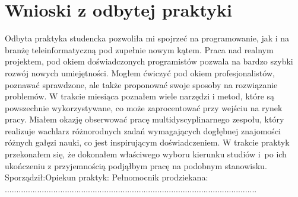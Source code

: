 \documentclass[12pt, a4paper, oneside]{article}
\begin{document}
\section{Wnioski z odbytej praktyki}
\indent\indent Odbyta praktyka studencka pozwoliła mi spojrzeć na programowanie, jak i na branżę teleinformatyczną pod zupełnie nowym kątem. Praca nad realnym projektem, pod okiem doświadczonych programistów pozwala na bardzo szybki rozwój nowych umiejętności. Mogłem ćwiczyć pod okiem profesjonalistów, poznawać sprawdzone, ale także proponować swoje sposoby na rozwiązanie problemów. W trakcie miesiąca poznałem wiele narzędzi i metod, które są powszechnie wykorzystywane, co może zaprocentować przy wejściu na rynek pracy. Miałem okazję obserwować pracę multidyscyplinarnego zespołu, który realizuje wachlarz różnorodnych zadań wymagających dogłębnej znajomości różnych gałęzi nauki, co jest inspirującym doświadczeniem. W trakcie praktyk przekonałem się, że dokonałem właściwego wyboru kierunku studiów i~po ich ukończeniu z przyjemnością podjąłbym pracę na podobnym stanowisku.
\newline\newline\newline
\indent Sporządził:\qquad\qquad\qquad\qquad Opiekun praktyk: \qquad\qquad\qquad\qquad Pełnomocnik prodziekana:
\newline\newline\newline
.............................\qquad\qquad\quad ....................................\quad\quad\qquad\qquad ............................................
\end{document}
